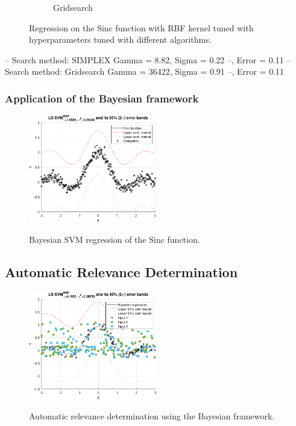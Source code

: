 \documentclass{article}
\begin{document}
\begin{figure}[h]
\begin{subfigure}[b]{0.4\textwidth}
                     \caption{Gridsearch}
                     \label{fig:regression_grisearch_tuned}
                 \end{subfigure}
                 \hspace{0.05\textwidth}
                \caption{Regression on the Sinc function with RBF kernel tuned with hyperparameters tuned with different algorithms.}
            \end{figure}
            --
            Search method: SIMPLEX
              Gamma = 8.82, Sigma = 0.22 --, Error = 0.11
            --
            Search method: Gridsearch
              Gamma = 36422, Sigma = 0.91 --, Error = 0.11
        
        \subsubsection{Application of the Bayesian framework}
            \begin{figure}[h]
                 \centering
                 \includegraphics[width=0.5\textwidth]{Assignment 2/figures/1_2/bayesian_regression.pdf}
                 \label{fig:bayesianregression_sinc}
                \caption{Bayesian SVM regression of the Sinc function. }
            \end{figure}
        
    \subsection{Automatic Relevance Determination}
        \begin{figure}[h]
             \centering
             \includegraphics[width=0.5\textwidth]{Assignment 2/figures/1_3/bayesian_regression.pdf}
             \label{fig:bayesianregression_ard}
            \caption{Automatic relevance determination using the Bayesian framework. }
        \end{figure}
            
\end{document}
